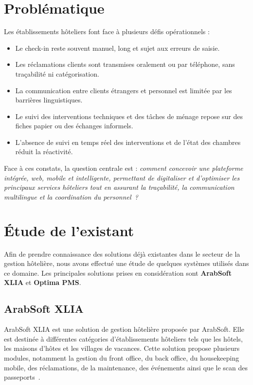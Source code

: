 \section{Problématique}
Les établissements hôteliers font face à plusieurs défis opérationnels :
\begin{itemize}
    \item Le check-in reste souvent manuel, long et sujet aux erreurs de saisie.
    \item Les réclamations clients sont transmises oralement ou par téléphone, sans traçabilité ni catégorisation.
    \item La communication entre clients étrangers et personnel est limitée par les barrières linguistiques.
    \item Le suivi des interventions techniques et des tâches de ménage repose sur des fiches papier ou des échanges informels.
    \item L'absence de suivi en temps réel des interventions et de l'état des chambres réduit la réactivité.
\end{itemize}

Face à ces constats, la question centrale est : \textit{comment concevoir une plateforme intégrée, web, mobile et intelligente, permettant de digitaliser et d'optimiser les principaux services hôteliers tout en assurant la traçabilité, la communication multilingue et la coordination du personnel~?}

\section{Étude de l'existant}
Afin de prendre connaissance des solutions déjà existantes dans le secteur de la gestion hôtelière, nous avons effectué une étude de quelques systèmes utilisés dans ce domaine. Les principales solutions prises en considération sont \textbf{ArabSoft XLIA} et \textbf{Optima PMS}.

\subsection{ArabSoft XLIA}
ArabSoft XLIA est une solution de gestion hôtelière proposée par ArabSoft. Elle est destinée à différentes catégories d'établissements hôteliers tels que les hôtels, les maisons d'hôtes et les villages de vacances. Cette solution propose plusieurs modules, notamment la gestion du front office, du back office, du housekeeping mobile, des réclamations, de la maintenance, des événements ainsi que le scan des passeports~\cite{react}.

